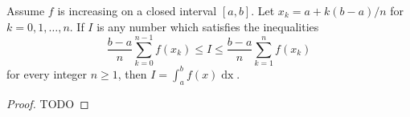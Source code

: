 \documentclass{report}
\begin{document}
\begin{theorem}[1.13]

  Assume $f$ is increasing on a closed interval $[a, b]$.
  Let $x_k = a + k(b - a) / n$ for $k = 0, 1, \ldots, n$.
  If $I$ is any number which satisfies the inequalities
    $$\frac{b - a}{n} \sum_{k=0}^{n-1} f(x_k)
      \leq I \leq
      \frac{b - a}{n} \sum_{k=1}^n f(x_k)$$
    for every integer $n \geq 1$, then $I = \int_a^b f(x) \mathop{dx}$.

\end{theorem}

\begin{proof}

  TODO

\end{proof}
\end{document}
